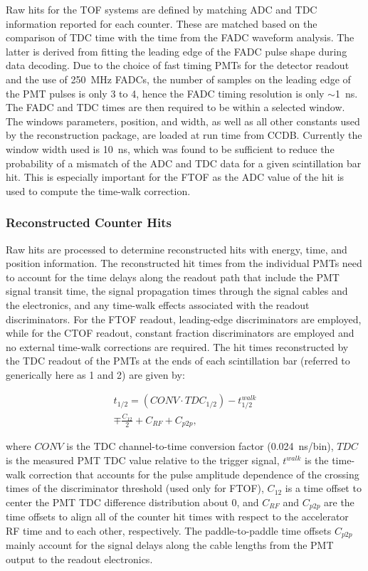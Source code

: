 Raw hits for the TOF systems are defined by matching ADC and TDC information reported for each counter. These
are matched based on the comparison of TDC time with the time from the FADC waveform analysis. The latter is
derived from fitting the leading edge of the FADC pulse shape during data decoding. Due to the choice of fast timing
PMTs for the detector readout and the use of 250~MHz FADCs, the number of samples on the leading edge of the
PMT pulses is only 3 to 4, hence the FADC timing resolution is only $\sim$1~ns. The FADC and TDC times are then
required to be within a selected window. The windows parameters, position, and width, as well as all other constants
used by the reconstruction package, are loaded at run time from CCDB. Currently the window width used is 10~ns,
which was found to be sufficient to reduce the probability of a mismatch of the ADC and TDC data for a given
scintillation bar hit. This is especially important for the FTOF as the ADC value of the hit is used to compute the
time-walk correction.

\subsubsection{Reconstructed Counter Hits}
\label{rec:hits}

Raw hits are processed to determine reconstructed hits with energy, time, and position information.  The
reconstructed hit times from the individual PMTs need to account for the time delays along the readout path
that include the PMT signal transit time, the signal propagation times through the signal cables and the electronics,
and any time-walk effects associated with the readout discriminators. For the FTOF readout, leading-edge
discriminators are employed, while for the CTOF readout, constant fraction discriminators are employed and no
external time-walk corrections are required. The hit times reconstructed by the TDC readout of the PMTs at the
ends of each scintillation bar (referred to generically here as 1 and 2) are given by:

\begin{multline}
t_{1/2} = (CONV \cdot TDC_{1/2}) - t_{1/2}^{walk} \\ \mp \frac{C_{12}}{2} + C_{RF} + C_{p2p},
\end{multline}

\noindent
where $CONV$ is the TDC channel-to-time conversion factor (0.024~ns/bin), $TDC$ is the measured PMT TDC
value relative to the trigger signal, $t^{walk}$ is the time-walk correction that accounts for the pulse amplitude
dependence of the crossing times of the discriminator threshold (used only for FTOF), $C_{12}$ is a time offset
to center the PMT TDC difference distribution about 0, and $C_{RF}$ and $C_{p2p}$ are the time offsets to
align all of the counter hit times with respect to the accelerator RF time and to each other, respectively. The
paddle-to-paddle time offsets $C_{p2p}$ mainly account for the signal delays along the cable lengths from the PMT
output to the readout electronics.

